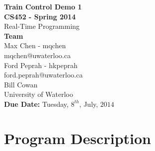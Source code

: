 \documentclass[12pt]{article}
\begin{document}
\thispagestyle{empty}
\begin{center}
  {\bf\Large Train Control Demo 1}\\
  {\bf\large CS452 - Spring 2014}\\
  Real-Time Programming\vspace{5cm}\\
  {\bf Team }\\
  Max Chen - mqchen\\
  mqchen@uwaterloo.ca\\[1\baselineskip]
  Ford Peprah - hkpeprah\\
  ford.peprah@uwaterloo.ca\vspace{5cm}\\
  Bill Cowan\\
  University of Waterloo\\
  {\bf Due Date:} Tuesday, $8^{th}$, July, $2014$
\end{center}
\newpage
\thispagestyle{empty}
\tableofcontents
\newpage
\section{Program Description}
\end{document}
